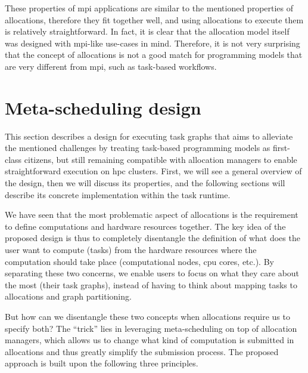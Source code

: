 These properties of \gls{mpi} applications are similar to the mentioned properties of
allocations, therefore they fit together well, and using allocations to execute them is relatively
straightforward. In fact, it is clear that the allocation model itself was designed with
\gls{mpi}-like use-cases in mind. Therefore, it is not very surprising that the
concept of allocations is not a good match for programming models that are very different from
\gls{mpi}, such as task-based workflows.


\section{Meta-scheduling design}
This section describes a design for executing task graphs that aims to alleviate the mentioned
challenges by treating task-based programming models as first-class citizens, but still remaining
compatible with allocation managers to enable straightforward execution on \gls{hpc}
clusters. First, we will see a general overview of the design, then we will discuss its properties,
and the following sections will describe its concrete implementation within the
\hyperqueue{} task runtime.

We have seen that the most problematic aspect of allocations is the requirement to define
computations and hardware resources together. The key idea of the proposed design is thus to
completely disentangle the definition of what does the user want to compute (tasks) from the
hardware resources where the computation should take place (computational nodes,
\gls{cpu} cores, etc.). By separating these two concerns, we enable users to focus on
what they care about the most (their task graphs), instead of having to think about mapping tasks
to allocations and graph partitioning.

But how can we disentangle these two concepts when allocations require us to specify both? The
``trick'' lies in leveraging meta-scheduling on top of allocation managers, which allows us to
change what kind of computation is submitted in allocations and thus greatly simplify the
submission process. The proposed approach is built upon the following three principles.

